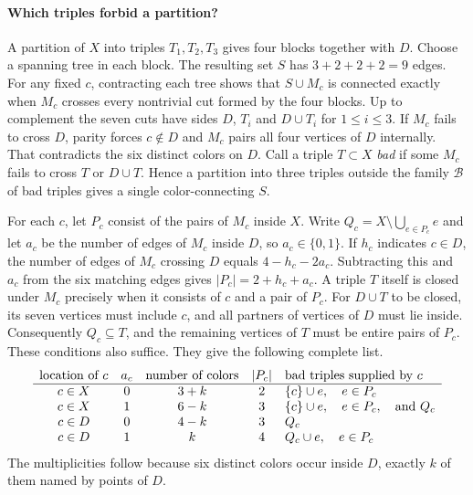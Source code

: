 \documentclass[11pt]{article}
\begin{document}
\paragraph{Which triples forbid a partition?}
A partition of $X$ into triples $T_1,T_2,T_3$ gives four blocks together
with $D$. Choose a spanning tree in each block. The resulting set $S$
has $3+2+2+2=9$ edges. For any fixed $c$, contracting each tree shows
that $S\cup M_c$ is connected exactly when $M_c$ crosses every
nontrivial cut formed by the four blocks. Up to complement the seven
cuts have sides $D$, $T_i$ and $D\cup T_i$ for $1\leq i\leq3$.
If $M_c$ fails to cross $D$, parity forces $c\notin D$ and $M_c$
pairs all four vertices of $D$ internally. That contradicts the six
distinct colors on $D$. Call a triple $T\subset X$ \emph{bad} if some
$M_c$ fails to cross $T$ or $D\cup T$. Hence a partition into three
triples outside the family $\mathcal B$ of bad triples gives a single
color-connecting $S$.

For each $c$, let $P_c$ consist of the pairs of $M_c$ inside $X$.
Write $Q_c=X\setminus\bigcup_{e\in P_c}e$ and let $a_c$ be the number
of edges of $M_c$ inside $D$, so $a_c\in\{0,1\}$. If $h_c$ indicates
$c\in D$, the number of edges of $M_c$ crossing $D$ equals
$4-h_c-2a_c$. Subtracting this and $a_c$ from the six matching edges
gives $|P_c|=2+h_c+a_c$. A triple $T$ itself is closed under $M_c$
precisely when it consists of $c$ and a pair of $P_c$. For $D\cup T$
to be closed, its seven vertices must include $c$, and all partners
of vertices of $D$ must lie inside. Consequently $Q_c\subseteq T$,
and the remaining vertices of $T$ must be entire pairs of $P_c$.
These conditions also suffice. They give the following complete list.
\[
\begin{array}{c c c c l}
\text{location of }c & a_c & \text{number of colors} & |P_c| &
                \text{bad triples supplied by }c\\ \hline
c\in X & 0 & 3+k & 2 & \{c\}\cup e,\quad e\in P_c\\
c\in X & 1 & 6-k & 3 & \{c\}\cup e,\quad e\in P_c,\quad\text{and }Q_c\\
c\in D & 0 & 4-k & 3 & Q_c\\
c\in D & 1 & k   & 4 & Q_c\cup e,\quad e\in P_c
\end{array}
\]
The multiplicities follow because six distinct colors occur inside
$D$, exactly $k$ of them named by points of $D$.
\end{document}
